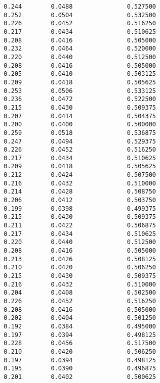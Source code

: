 \documentclass[
  letterpaper,
  DIV=11,
  numbers=noendperiod]{scrartcl}
\begin{document}
\begin{verbatim}
  0.244        0.0488               0.527500              
  0.252        0.0504               0.532500              
  0.226        0.0452               0.516250              
  0.217        0.0434               0.510625              
  0.208        0.0416               0.505000              
  0.232        0.0464               0.520000              
  0.220        0.0440               0.512500              
  0.208        0.0416               0.505000              
  0.205        0.0410               0.503125              
  0.209        0.0418               0.505625              
  0.253        0.0506               0.533125              
  0.236        0.0472               0.522500              
  0.215        0.0430               0.509375              
  0.207        0.0414               0.504375              
  0.200        0.0400               0.500000              
  0.259        0.0518               0.536875              
  0.247        0.0494               0.529375              
  0.226        0.0452               0.516250              
  0.217        0.0434               0.510625              
  0.209        0.0418               0.505625              
  0.212        0.0424               0.507500              
  0.216        0.0432               0.510000              
  0.214        0.0428               0.508750              
  0.206        0.0412               0.503750              
  0.199        0.0398               0.499375              
  0.215        0.0430               0.509375              
  0.211        0.0422               0.506875              
  0.217        0.0434               0.510625              
  0.220        0.0440               0.512500              
  0.208        0.0416               0.505000              
  0.213        0.0426               0.508125              
  0.210        0.0420               0.506250              
  0.215        0.0430               0.509375              
  0.216        0.0432               0.510000              
  0.204        0.0408               0.502500              
  0.226        0.0452               0.516250              
  0.208        0.0416               0.505000              
  0.202        0.0404               0.501250              
  0.192        0.0384               0.495000              
  0.197        0.0394               0.498125              
  0.228        0.0456               0.517500              
  0.210        0.0420               0.506250              
  0.197        0.0394               0.498125              
  0.195        0.0390               0.496875              
  0.201        0.0402               0.500625              

\end{verbatim}
\end{document}
